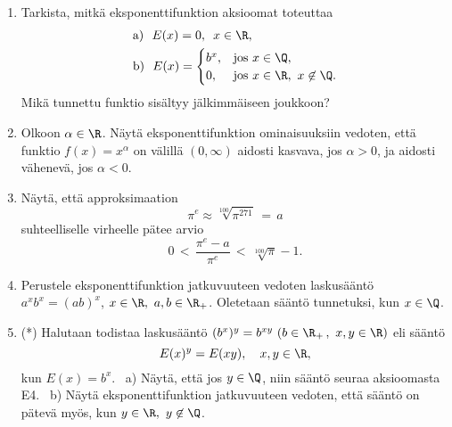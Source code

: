 \Harj
\begin{enumerate}

\item
Tarkista, mitkä eksponenttifunktion aksioomat toteuttaa 
\begin{align*}
&\text{a)}\ \ E(x)=0,\,\ x\in\R, \\
&\text{b)}\ \ E(x)=\begin{cases} 
                   b^x, &\text{jos}\ x\in\Q, \\ 0, &\text{jos}\ x\in\R,\ x\not\in\Q. 
                   \end{cases}
\end{align*}
Mikä tunnettu funktio sisältyy jälkimmäiseen joukkoon?

\item
Olkoon $\alpha\in\R$. Näytä eksponenttifunktion ominaisuuksiin vedoten, että funktio
$f(x)=x^\alpha$ on välillä $(0,\infty)$ aidosti kasvava, jos $\alpha>0$, ja aidosti vähenevä,
jos $\alpha<0$.

\item
Näytä, että approksimaation
\[
\pi^e \approx \sqrt[100]{\pi^{271}}\,=\,a
\]
suhteelliselle virheelle pätee arvio
\[
0\,<\,\frac{\pi^e-a}{\pi^e}\,<\,\sqrt[100]{\pi}-1.
\]

\item \label{H-exp-1: sääntö 1}
Perustele eksponenttifunktion jatkuvuuteen vedoten laskusääntö $a^xb^x=(ab)^x$,
$x\in\R,\ a,b\in\R_+$. Oletetaan sääntö tunnetuksi, kun $x\in\Q$.

\item (*) \label{H-exp-1: sääntö 2}
Halutaan todistaa laskusääntö $(b^x)^y=b^{xy}\ (b\in\R_+\,,\ x,y\in\R)$ eli sääntö
\[
E(x)^y=E(xy), \quad x,y\in\R,
\]
kun $E(x)=b^x$. \ a) Näytä, että jos $y\in\Q$, niin sääntö seuraa aksioomasta E4. \
b) Näytä eksponenttifunktion jatkuvuuteen vedoten, että sääntö on pätevä myös, kun 
$y\in\R,\ y\not\in\Q$.

\end{enumerate} 
